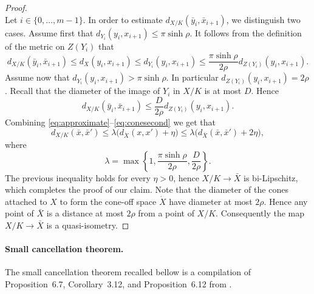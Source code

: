\documentclass[11pt]{article}
\theoremstyle{definition}
\theoremstyle{remark}
\begin{document}
\begin{proof}
\begin{equation}
\end{equation}
Let $i\in\{0,\ldots,m-1\}$. In order to estimate $d_{X/K}(\bar y_i,\bar x_{i+1})$, we distinguish two cases. Assume first that $d_{Y_i}(y_i,x_{i+1})\leqslant\pi\sinh\rho$. It follows from the definition of the metric on $Z(Y_i)$ that
\begin{equation}\label{eq:conefirst}
d_{X/K}(\bar y_i,\bar x_{i+1})\leqslant d_X(y_i,x_{i+1})\leqslant d_{Y_i}(y_i,x_{i+1})\leqslant\frac{\pi\sinh\rho}{2\rho}d_{Z(Y_i)}(y_i,x_{i+1}).
\end{equation}
Assume now that $d_{Y_i}(y_i,x_{i+1})>\pi\sinh\rho$. In particular $d_{Z(Y_i)}(y_i,x_{i+1})=2\rho$. Recall that the diameter of the image of $Y_i$ in $X/K$ is at most $D$. Hence
\begin{equation}\label{eq:conesecond}
d_{X/K}(\bar y_i,\bar x_{i+1})\leqslant\frac{D}{2\rho}d_{Z(Y_i)}(y_i,x_{i+1}).
\end{equation}
Combining \eqref{eq:approximate}--\eqref{eq:conesecond} we get that
\[
d_{X/K}(\bar x,\bar x')\leqslant\lambda\bigl(d_{\dot X}(x,x')+\eta\bigr)\leqslant\lambda\bigl(d_{\bar X}(\bar x,\bar x')+2\eta\bigr),
\]
where
\[
\lambda=\max\left\{1,\frac{\pi\sinh\rho}{2\rho},\frac{D}{2\rho}\right\}.
\]
The previous inequality holds for every $\eta>0$, hence $X/K\to\bar X$ is bi-Lipschitz, which completes the proof of our claim. Note that the diameter of the cones attached to $X$ to form the cone-off space $\dot X$ have diameter at most $2\rho$. Hence any point of $\bar X$ is a distance at most $2\rho$ from a point of $X/K$. Consequently the map $X/K\to\bar X$ is a quasi-isometry.
\end{proof}

\paragraph*{Small cancellation theorem.}
The small cancellation theorem recalled bellow is a compilation of Proposition~6.7, Corollary~3.12, and Proposition~6.12 from \cite{ref06}.
\end{document}
